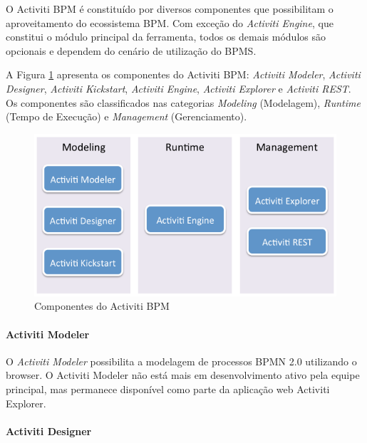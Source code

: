 O Activiti BPM é constituído por diversos componentes que possibilitam o aproveitamento do ecossistema BPM. Com exceção do \textit{Activiti Engine}, que constitui o módulo principal da ferramenta, todos os demais módulos são opcionais e dependem do cenário de utilização do BPMS.

A Figura \ref{fig:activiti_componentes} apresenta os componentes do Activiti BPM: \textit{Activiti Modeler}, \textit{Activiti Designer}, \textit{Activiti Kickstart}, \textit{Activiti Engine}, \textit{Activiti Explorer} e \textit{Activiti REST}. Os componentes são classificados nas categorias \textit{Modeling} (Modelagem), \textit{Runtime} (Tempo de Execução) e \textit{Management} (Gerenciamento).

\begin{figure}[H]
\centering
\includegraphics[width=1\textwidth]{imagens/activiti_components_overview.png}
\caption{Componentes do Activiti BPM\cite{activiti_componentes}}
\label{fig:activiti_componentes}
\end{figure}


\paragraph{Activiti Modeler}\label{sec:automatizacao_processos-gestao_processos_activiti_modeler}

O \textit{Activiti Modeler} possibilita a modelagem de processos BPMN 2.0 utilizando o browser. O Activiti Modeler não está mais em desenvolvimento ativo pela equipe principal, mas permanece disponível como parte da aplicação web Activiti Explorer.

\paragraph{Activiti Designer}\label{sec:automatizacao_processos-gestao_processos_activiti_designer}

